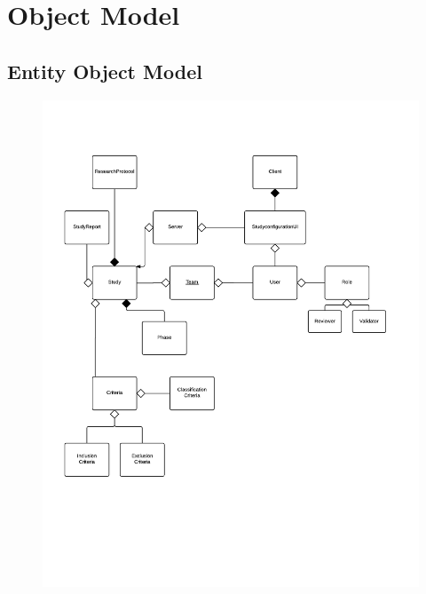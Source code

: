 \section{Object Model}
\subsection{Entity Object Model}
\begin{figure}[H]
  \includegraphics[width=45em]{section/EntityObjectModel/Entity_Object_Model}
  \label{fig:Entity Object Model}
\end{figure}